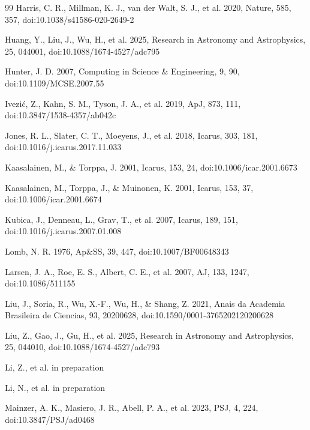 \documentclass[referee]{raa}
\begin{document}
\begin{thebibliography}{99}
Harris, C. R., Millman, K. J., van der Walt, S. J., et al. 2020, Nature, 585, 357, doi:10.1038/s41586-020-2649-2

Huang, Y., Liu, J., Wu, H., et al. 2025, Research in Astronomy and Astrophysics, 25, 044001, doi:10.1088/1674-4527/adc795

Hunter, J. D. 2007, Computing in Science \& Engineering, 9, 90, doi:10.1109/MCSE.2007.55

Ivezi\'c, Z., Kahn, S. M., Tyson, J. A., et al. 2019, ApJ, 873, 111, doi:10.3847/1538-4357/ab042c

Jones, R. L., Slater, C. T., Moeyens, J., et al. 2018, Icarus, 303, 181, doi:10.1016/j.icarus.2017.11.033

Kaasalainen, M., \& Torppa, J. 2001, Icarus, 153, 24, doi:10.1006/icar.2001.6673

Kaasalainen, M., Torppa, J., \& Muinonen, K. 2001, Icarus, 153, 37, doi:10.1006/icar.2001.6674

Kubica, J., Denneau, L., Grav, T., et al. 2007, Icarus, 189, 151, doi:10.1016/j.icarus.2007.01.008

Lomb, N. R. 1976, Ap\&SS, 39, 447, doi:10.1007/BF00648343

Larsen, J. A., Roe, E. S., Albert, C. E., et al. 2007, AJ, 133, 1247, doi:10.1086/511155

Liu, J., Soria, R., Wu, X.-F., Wu, H., \& Shang, Z. 2021, Anais da Academia Brasileira de Ciencias, 93, 20200628, doi:10.1590/0001-3765202120200628

Liu, Z., Gao, J., Gu, H., et al. 2025, Research in Astronomy and Astrophysics, 25, 044010, doi:10.1088/1674-4527/adc793

Li, Z., et al. in preparation

Li, N., et al. in preparation

Mainzer, A. K., Masiero, J. R., Abell, P. A., et al. 2023, PSJ, 4, 224, doi:10.3847/PSJ/ad0468


\end{thebibliography}
\end{document}

